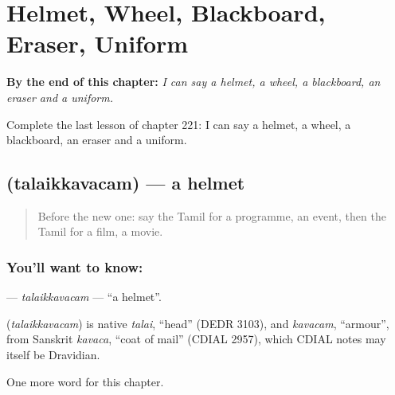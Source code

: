 
\chapter{Helmet, Wheel, Blackboard, Eraser, Uniform}
\label{ch:ta-helmet-wheel-blackboard-eraser-uniform}

\begin{chapteropening}
\textbf{By the end of this chapter:} \emph{I can say a helmet, a wheel, a blackboard, an eraser and a uniform.}

Complete the last lesson of chapter 221: I can say a helmet, a wheel, a blackboard, an eraser and a uniform.
\end{chapteropening}

\section[\texorpdfstring{\ta{தலைக்கவசம்} (talaikkavacam)}{தலைக்கவசம் (talaikkavacam)}]{ (talaikkavacam) — a helmet}

\label{lesson:TA-C221-talaikkavacam}



\begin{quote}
Before the new one: say the Tamil for a programme, an event, then the Tamil for a film, a movie.
\end{quote}

\subsection*{You'll want to know: }
\textbf{} — \emph{talaikkavacam} — \textquotedblleft{}a helmet\textquotedblright{}.

\begin{cousinweb}
\textbf{} (\emph{talaikkavacam}) is native \emph{talai}, \textquotedblleft{}head\textquotedblright{} (DEDR 3103), and \emph{kavacam}, \textquotedblleft{}armour\textquotedblright{}, from Sanskrit \emph{kavaca}, \textquotedblleft{}coat of mail\textquotedblright{} (CDIAL 2957), which CDIAL notes may itself be Dravidian.
\end{cousinweb}

\begin{grammarlens}[title={What you've built}]
One more word for this chapter.
\end{grammarlens}

